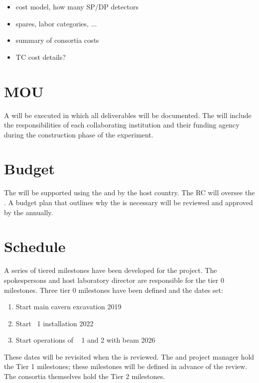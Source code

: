 \begin{itemize}
 \item cost model, how many SP/DP detectors
 \item spares, labor categories, ...
 \item summary of consortia costs
 \item TC cost details?
\end{itemize}

\section{MOU}
\label{sec:fdsp-coord-mou}

A  will be executed in which all deliverables will be
documented. The  will include the responsibilities of each
collaborating institution and their funding agency during the
construction phase of the experiment.

\section{Budget}
\label{sec:fdsp-coord-budget}

The   will be supported using the  and by the host
country. The RC will oversee the . 
A budget plan that outlines why the  is necessary will be reviewed and
approved by the  annually. 

\section{Schedule}
\label{sec:fdsp-coord-controls}

A series of tiered milestones have been developed for the 
project. The spokespersons and host
laboratory director are responsible for the tier 0 milestones. Three tier 0 milestones have been defined and the dates set:
\begin{enumerate}
\item Start main cavern excavation \hspace{2.58in} 2019
\item Start ~1 installation \hspace{2.1in} 2022
\item Start operations of ~  1 and 2 with beam \hspace{1in} 2026
\end{enumerate}
These dates will be revisited when the  is reviewed. The  and  project
manager hold the Tier 1
milestones; these milestones will be defined in advance of the  review. The consortia themselves hold the Tier 2
milestones.

